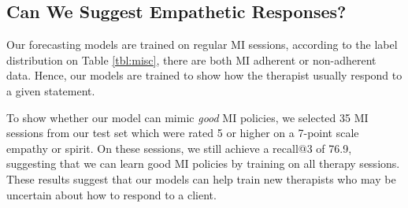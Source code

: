 \subsection{Can We Suggest Empathetic Responses?}

Our forecasting models are trained on regular MI sessions, according
to the label distribution on Table \ref{tbl:misc}, there are both MI
adherent or non-adherent data. Hence, our models are trained to show
how the therapist usually respond to a given statement.

To show whether our model can mimic {\em good} MI policies, we
selected 35 MI sessions from our test set which were rated 5 or
higher on a 7-point scale empathy or spirit. On these sessions, we
still achieve a recall@3 of 76.9, suggesting that we can learn good
MI policies by training on all therapy sessions. These results
suggest that our models can help train new
therapists who may be uncertain about how to respond to a client.



